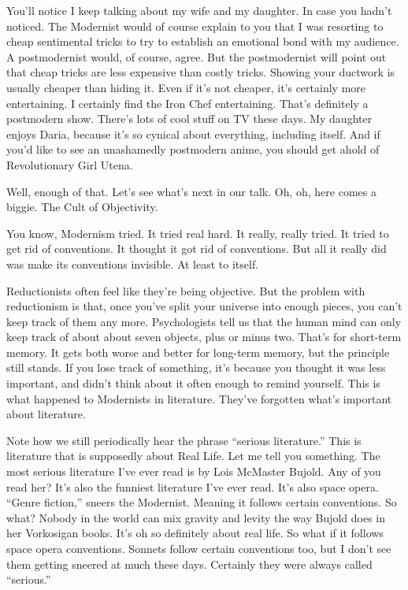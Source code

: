 You'll notice I keep talking about my wife and my daughter. In case you
hadn't noticed. The Modernist would of course explain to you that I was
resorting to cheap sentimental tricks to try to establish an emotional bond
with my audience. A postmodernist would, of course, agree. But the
postmodernist will point out that cheap tricks are less expensive than costly
tricks. Showing your ductwork is usually cheaper than hiding it. Even if it's
not cheaper, it's certainly more entertaining. I certainly find the Iron Chef
entertaining. That's definitely a postmodern show. There's lots of cool stuff
on TV these days. My daughter enjoys Daria, because it's so cynical about
everything, including itself. And if you'd like to see an unashamedly
postmodern anime, you should get ahold of Revolutionary Girl Utena.

Well, enough of that. Let's see what's next in our talk. Oh, oh, here comes a
biggie. The Cult of Objectivity.

You know, Modernism tried. It tried real hard. It really, really tried. It
tried to get rid of conventions. It thought it got rid of conventions. But
all it really did was make its conventions invisible. At least to itself.

Reductionists often feel like they're being objective. But the problem with
reductionism is that, once you've split your universe into enough pieces, you
can't keep track of them any more. Psychologists tell us that the human mind
can only keep track of about about seven objects, plus or minus two. That's
for short-term memory. It gets both worse and better for long-term memory,
but the principle still stands. If you lose track of something, it's because
you thought it was less important, and didn't think about it often enough to
remind yourself. This is what happened to Modernists in literature. They've
forgotten what's important about literature.

Note how we still periodically hear the phrase ``serious literature.'' This
is literature that is supposedly about Real Life. Let me tell you something.
The most serious literature I've ever read is by Lois McMaster Bujold. Any of
you read her? It's also the funniest literature I've ever read. It's also
space opera. ``Genre fiction,'' sneers the Modernist. Meaning it follows
certain conventions. So what? Nobody in the world can mix gravity and levity
the way Bujold does in her Vorkosigan books. It's oh so definitely about real
life. So what if it follows space opera conventions. Sonnets follow certain
conventions too, but I don't see them getting sneered at much these days.
Certainly they were always called ``serious.''

